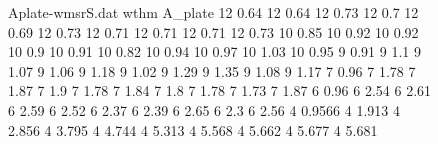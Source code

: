 \begin{figure}[H]
    \centering
        \begin{filecontents}{Aplate-wmsrS.dat}
                    wthm   A_plate
                    12	0.64
                    12	0.64
                    12	0.73
                    12	0.7
                    12	0.69
                    12	0.73
                    12	0.71
                    12	0.71
                    12	0.71
                    12	0.73
                    10	0.85
                    10	0.92
                    10	0.92
                    10	0.9
                    10	0.91
                    10	0.82
                    10	0.94
                    10	0.97
                    10	1.03
                    10	0.95
                    9	0.91
                    9	1.1
                    9	1.07
                    9	1.06
                    9	1.18
                    9	1.02
                    9	1.29
                    9	1.35
                    9	1.08
                    9	1.17
                    7	0.96
                    7	1.78
                    7	1.87
                    7	1.9
                    7	1.78
                    7	1.84
                    7	1.8
                    7	1.78
                    7	1.73
                    7	1.87
                    6	0.96
                    6	2.54
                    6	2.61
                    6	2.59
                    6	2.52
                    6	2.37
                    6	2.39
                    6	2.65
                    6	2.3
                    6	2.56
                    4	0.9566
                    4	1.913
                    4	2.856
                    4	3.795
                    4	4.744
                    4	5.313
                    4	5.568
                    4	5.662
                    4	5.677
                    4	5.681         
            \end{filecontents}
        

\end{figure}
